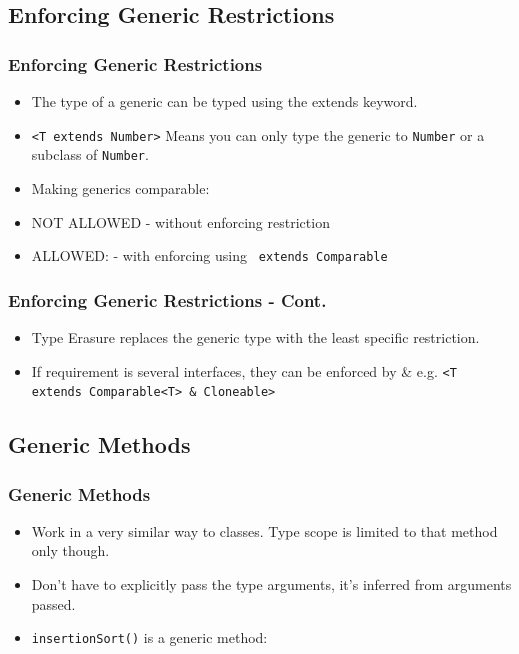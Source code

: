 \documentclass{beamer}
\begin{document}
\subsection{Enforcing Generic Restrictions}
\begin{frame}
\frametitle{Enforcing Generic Restrictions}
\begin{itemize}
\item The type of a generic can be typed using the {\color{red} extends} keyword. \item \texttt{<T {\color{blue}extends} Number>} Means you can only type the generic to \texttt{Number} or a subclass of \texttt{Number}.
\item Making generics comparable:
\item {\color{red} NOT ALLOWED} - without enforcing restriction
\genCom
\item {\color{green} ALLOWED:} - with enforcing using \texttt{{\color{blue} extends} Comparable}
\genComTwo
\end{itemize}
\end{frame}
\begin{frame}
\frametitle{Enforcing Generic Restrictions - Cont.}
\begin{itemize}
\item {\color{red} Type Erasure} replaces the generic type with the least specific restriction.
\item If requirement is several interfaces, they can be enforced by \& e.g. \texttt{<T {\color{blue} extends} Comparable<T> \& Cloneable>}
\end{itemize}
\end{frame}
\subsection{Generic Methods}
\begin{frame}
\frametitle{Generic Methods}
\begin{itemize}
\item Work in a very similar way to classes. Type scope is limited to that method only though.
\item Don't have to explicitly pass the type arguments, it's inferred from arguments passed.
\item \texttt{insertionSort()} is a generic method:
\genMeth
\end{itemize}
\end{frame}
\end{document}
